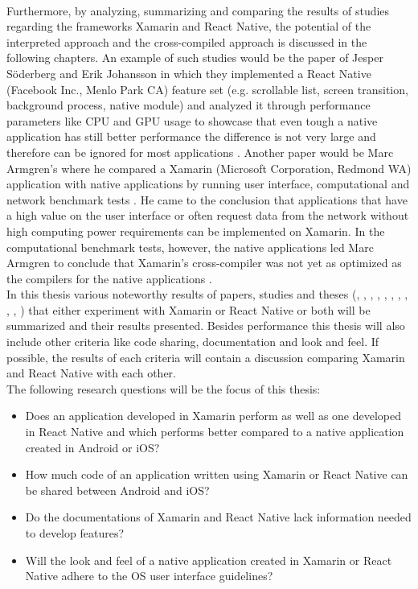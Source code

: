 \documentclass[Bachelor,BIF,english]{twbook}
\begin{document}
\\[\baselineskip]
Furthermore, by analyzing, summarizing and comparing the results of studies regarding the frameworks Xamarin and React Native, the potential of the interpreted approach and the cross-compiled approach is discussed in the following chapters. An example of such studies would be the paper of Jesper Söderberg and Erik Johansson in which they implemented a React Native (Facebook Inc., Menlo Park CA) feature set (e.g. scrollable list, screen transition, background process, native module) and analyzed it through performance parameters like CPU and GPU usage to showcase that even tough a native application has still better performance the difference is not very large and therefore can be ignored for most applications \cite{JohanssonSderberg2018}. Another paper would be Marc Armgren's where he compared a Xamarin (Microsoft Corporation, Redmond WA) application with native applications by running user interface, computational and network benchmark tests \cite{Armgren_2015}. He came to the conclusion that applications that have a high value on the user interface or often request data from the network without high computing power requirements can be implemented on Xamarin. In the computational benchmark tests, however, the native applications led Marc Armgren to conclude that Xamarin's cross-compiler was not yet as optimized as the compilers for the native applications \cite{Armgren_2015}.
\\[\baselineskip]
In this thesis various noteworthy results of papers, studies and theses (\cite{Danielsson_2016}, \cite{Hansson_Vidhall_2016}, \cite{MartinezLecomte2018}, \cite{ZubaBernhard2017EdPb}, \cite{WillocxVossaertNaessens2015}, \cite{MartinezLecomte2017}, \cite{Dickson_2013}, \cite{GaouarBenamarBendimerad2016}, \cite{7479278}, \cite{LinckArne2016}, \cite{7934674}) that either experiment with Xamarin or React Native or both will be summarized and their results presented. Besides performance this thesis will also include other criteria like code sharing, documentation and look and feel. If possible, the results of each criteria will contain a discussion comparing Xamarin and React Native with each other. 
\\[\baselineskip]
The following research questions will be the focus of this thesis:
\begin{itemize}
\item Does an application developed in Xamarin perform as well as one developed in React Native and which performs better compared to a native application created in Android or iOS?
\item How much code of an application written using Xamarin or React Native can be shared between Android and iOS?
\item Do the documentations of Xamarin and React Native lack information needed to develop features?
\item Will the look and feel of a native application created in Xamarin or React Native adhere to the OS user interface guidelines?
\end{itemize}
\end{document}
